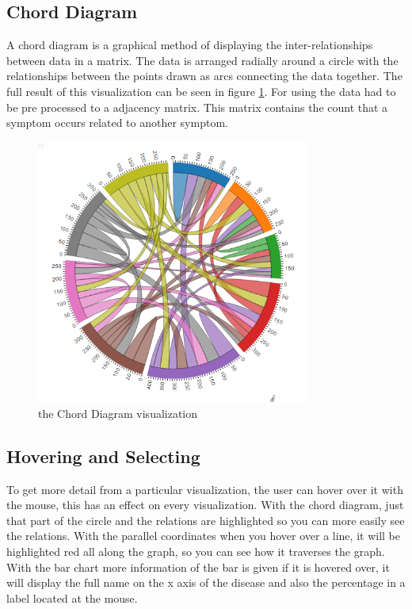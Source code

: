\documentclass[a4paper,twoside,11pt]{article}
\begin{document}
\subsection{Chord Diagram}
A chord diagram is a graphical method of displaying the inter-relationships between data in a matrix. The data is arranged radially around a circle with the relationships between the points drawn as arcs connecting the data together. The full result of this visualization can be seen in figure \ref{fig:Chord}\newline. For using the data had to be pre processed to a adjacency matrix. This matrix contains the count that a symptom occurs related to another symptom.
\begin{figure}[h]
\begin{center}
    \includegraphics[width=0.8\textwidth]{images/chordDiagramSolo.PNG}
    \caption{the Chord Diagram visualization}
    \label{fig:Chord}
\end{center}
\end{figure}
\newpage
\subsection{Hovering and Selecting}
To get more detail from a particular visualization, the user can hover over it with the mouse, this has an effect on every visualization. \newline
With the chord diagram, just that part of the circle and the relations are highlighted so you can more easily see the relations. \newline
With the parallel coordinates when you hover over a line, it will be highlighted red all along the graph, so you can see how it traverses the graph. \newline
With the bar chart more information of the bar is given if it is hovered over, it will display the full name on the x axis of the disease and also the percentage in a label located at the mouse.
\end{document}
